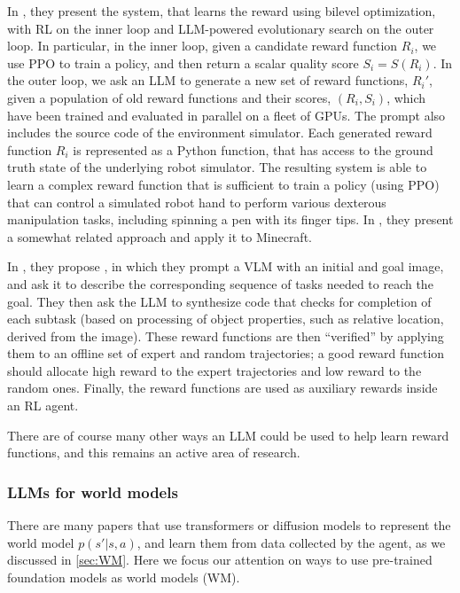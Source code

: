 In \citep{eureka}, they present
the  system,
that learns the reward using bilevel optimization,
with RL on the inner
loop and LLM-powered evolutionary search on the outer loop.
In particular, in the inner loop, given a candidate reward function $R_i$,
we use PPO to train a policy,
and then return a scalar quality score $S_i=S(R_i)$.
In the outer loop, we ask
an LLM to generate a new set of reward functions, $R_i'$,
given a population of old reward functions and their scores,
$(R_i,S_i)$, which  have been trained
and evaluated in parallel on a fleet of GPUs.
The prompt also includes the source code
of the environment simulator.
Each generated reward function $R_i$ is represented as a Python function,
that has access to the ground truth state of the underlying
robot simulator.
The resulting system is able to learn a complex reward function
that is sufficient to train a policy (using PPO) that
can control a simulated robot hand to perform various dexterous
manipulation tasks, including spinning a pen with its finger tips.
In \citep{Li2024mc}, they present
a somewhat related approach and apply it to Minecraft.

In \citep{Venuto2024}, they propose ,
in which they prompt a VLM with an initial and goal image,
and ask it to describe the corresponding sequence of tasks
needed to reach the goal.
They then ask the LLM 
to synthesize code that checks for  completion of each subtask
(based on processing of object properties, such as relative
location, derived from the image).
These reward functions are
then ``verified''
by applying them to
an offline set of expert and random trajectories;
a good reward function should allocate high reward to
the expert trajectories and low reward to the random ones.
Finally, the reward functions are 
used as auxiliary rewards inside an RL agent.


There are of course many other ways an LLM could be used to help
learn reward functions, and this remains an active area of research.

\subsubsection{LLMs for world models}

There are  many papers that use transformers
or diffusion models to represent the world model
$p(s'|s,a)$,  and learn them from data collected
by the agent, as we discussed in \cref{sec:WM}.
Here we focus our attention on ways to use
pre-trained foundation models as world models (WM).

